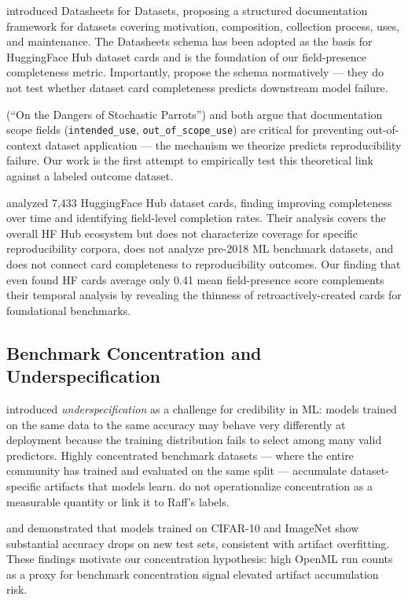 \citet{Gebru2021Datasheets} introduced Datasheets for Datasets, proposing a structured documentation framework for datasets covering motivation, composition, collection process, uses, and maintenance. The Datasheets schema has been adopted as the basis for HuggingFace Hub dataset cards and is the foundation of our field-presence completeness metric. Importantly, \citet{Gebru2021Datasheets} propose the schema normatively --- they do not test whether dataset card completeness predicts downstream model failure.

\citet{Bender2021Dangers} (``On the Dangers of Stochastic Parrots'') and \citet{Gebru2021Datasheets} both argue that documentation scope fields (\texttt{intended\_use}, \texttt{out\_of\_scope\_use}) are critical for preventing out-of-context dataset application --- the mechanism we theorize predicts reproducibility failure. Our work is the first attempt to empirically test this theoretical link against a labeled outcome dataset.

\citet{YoungXinyu18022024Analysis} analyzed 7,433 HuggingFace Hub dataset cards, finding improving completeness over time and identifying field-level completion rates. Their analysis covers the overall HF Hub ecosystem but does not characterize coverage for specific reproducibility corpora, does not analyze pre-2018 ML benchmark datasets, and does not connect card completeness to reproducibility outcomes. Our finding that even found HF cards average only 0.41 mean field-presence score complements their temporal analysis by revealing the thinness of retroactively-created cards for foundational benchmarks.

\subsection{Benchmark Concentration and Underspecification}

\citet{DAm2021Underspecification} introduced \emph{underspecification} as a challenge for credibility in ML: models trained on the same data to the same accuracy may behave very differently at deployment because the training distribution fails to select among many valid predictors. Highly concentrated benchmark datasets --- where the entire community has trained and evaluated on the same split --- accumulate dataset-specific artifacts that models learn. \citet{DAm2021Underspecification} do not operationalize concentration as a measurable quantity or link it to Raff's labels.

\citet{Recht2019Do} and \citet{Engstrom2020Identifying} demonstrated that models trained on CIFAR-10 and ImageNet show substantial accuracy drops on new test sets, consistent with artifact overfitting. These findings motivate our concentration hypothesis: high OpenML run counts as a proxy for benchmark concentration signal elevated artifact accumulation risk.

